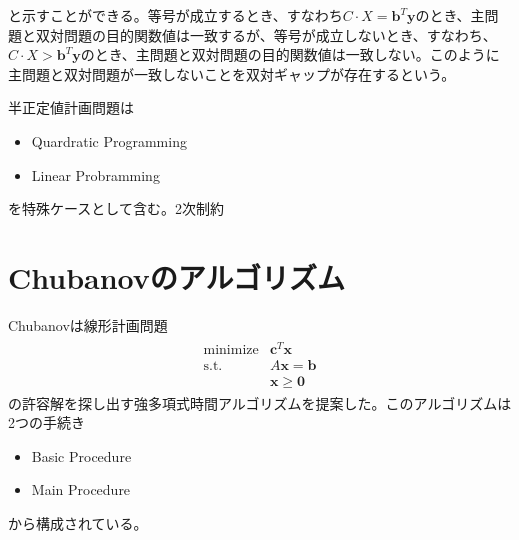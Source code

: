 と示すことができる。等号が成立するとき、すなわち$C \cdot X = \mathbf{b}^T \mathbf{y}$のとき、主問題と双対問題の目的関数値は一致するが、等号が成立しないとき、すなわち、$C \cdot X > \mathbf{b}^T \mathbf{y}$のとき、主問題と双対問題の目的関数値は一致しない。このように主問題と双対問題が一致しないことを双対ギャップが存在するという。

半正定値計画問題は
\begin{itemize}
  \item Quardratic Programming
  \item Linear Probramming
\end{itemize}
を特殊ケースとして含む。2次制約


\section{Chubanovのアルゴリズム}
Chubanovは線形計画問題
\begin{align*}
  \begin{array}{ll}
    \text{minimize} & \mathbf{c}^T \mathbf{x} \\
    \text{s.t.}     & A \mathbf{x} = \mathbf{b} \\
                    & \mathbf{x} \geq \mathbf{0}
  \end{array}
\end{align*}
の許容解を探し出す強多項式時間アルゴリズムを提案した。このアルゴリズムは2つの手続き
\begin{itemize}
  \item Basic Procedure
  \item Main Procedure
\end{itemize}
から構成されている。


